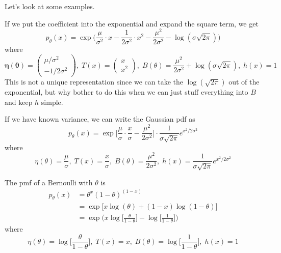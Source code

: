 \documentclass{article}
\begin{document}
    Let's look at some examples. 

    \begin{example}[Gaussian]
      If we put the coefficient into the exponential and expand the square term, we get 
      \[p_\theta (x) = \exp \bigg( \frac{\mu}{\sigma^2} \cdot x - \frac{1}{2\sigma^2} \cdot x^2 - \frac{\mu^2}{2 \sigma^2} - \log ( \sigma \sqrt{2 \pi}) \bigg)\] 
      where 
      \[\boldsymbol{\eta}(\boldsymbol{\theta}) = \begin{pmatrix} \mu /\sigma^2 \\ -1 / 2 \sigma^2 \end{pmatrix}, \; T(x) = \begin{pmatrix} x \\ x^2 \end{pmatrix}, \; B(\theta) = \frac{\mu^2}{2 \sigma^2} + \log(\sigma \sqrt{2 \pi}), \; h(x) = 1\]
      This is not a unique representation since we can take the $\log(\sqrt{2 \pi})$ out of the exponential, but why bother to do this when we can just stuff everything into $B$ and keep $h$ simple. 
    \end{example}

    \begin{example}
      If we have known variance, we can write the Gaussian pdf as 
      \[p_\theta (x) = \exp \bigg[ \frac{\mu}{\sigma} \cdot \frac{x}{\sigma} - \frac{\mu^2}{2 \sigma^2} \bigg] \cdot \frac{1}{\sigma \sqrt{2\pi}} e^{x^2/2 \sigma^2}\]
      where 
      \[\eta(\theta) = \frac{\mu}{\sigma}, \; T(x) = \frac{x}{\sigma}, \; B(\theta) = \frac{\mu^2}{2 \sigma^2}, \; h(x) = \frac{1}{\sigma \sqrt{2 \pi}} e^{x^2/2 \sigma^2}\]
    \end{example}

    \begin{example}[Bernoulli]
    The pmf of a Bernoulli with $\theta$ is 
    \begin{align*}
        p_\theta (x) & = \theta^x (1 - \theta)^{(1 - x)} \\
        & = \exp \big[x \log (\theta) + (1 - x)\log(1 - \theta) \big] \\
        & = \exp \bigg( x \log \Big[ \frac{\theta}{1 - \theta} \Big] - \log \Big[ \frac{1}{1 - \theta} \Big] \bigg)
    \end{align*}
    where 
    \[\eta(\theta) = \log \Big[ \frac{\theta}{1 - \theta} \Big], \; T(x) = x, \; B(\theta) = \log \Big[ \frac{1}{1 - \theta} \Big], \; h(x) = 1\]
    \end{example}
\end{document}
